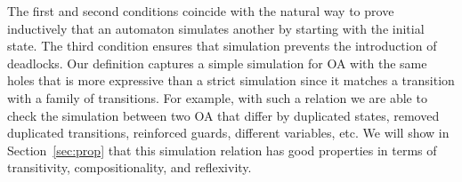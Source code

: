 \documentclass[runningheads]{llncs}
\newcommand{\xrightarrowdbl}[2][]{%
  \xrightarrow[#1]{#2}\mathrel{\mkern-14mu}\rightarrow
}
\begin{document}
The first and second conditions coincide with the natural way to prove inductively that an automaton simulates another by starting with the initial state. The third condition ensures that  simulation  prevents the introduction of deadlocks.
Our definition captures a simple simulation for OA with the same holes that is more expressive than a strict simulation since it matches a transition with a family of transitions. 
For example, with such a relation we are able to check the simulation between two OA that differ by duplicated states, removed duplicated transitions,  reinforced  guards, different variables, etc.
We will show in Section~\ref{sec:prop} that this simulation relation has good properties in terms of transitivity, compositionality, and reflexivity.



\end{document}
